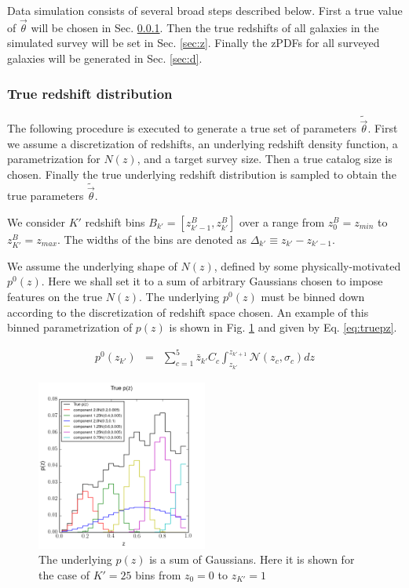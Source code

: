 \documentclass[preprint]{aastex}
\begin{document}
Data simulation consists of several broad steps described below.  First a true value of $\vec{\theta}$ will be chosen in Sec. \ref{sec:theta}.  Then the true redshifts of all galaxies in the simulated survey will be set in Sec. \ref{sec:z}.  Finally the zPDFs for all surveyed galaxies will be generated in Sec. \ref{sec:d}.

\clearpage
\subsubsection{True redshift distribution}
\label{sec:theta}

The following procedure is executed to generate a true set of parameters $\tilde{\vec{\theta}}$.  First we assume a discretization of redshifts, an underlying redshift density function, a parametrization for $N(z)$, and a target survey size.  Then a true catalog size is chosen.  Finally the true underlying redshift distribution is sampled to obtain the true parameters $\tilde{\vec{\theta}}$.

We consider $K'$ redshift bins $B_{k'}=[z^{B}_{k'-1},z^{B}_{k'}]$ over a range from $z^{B}_{0}=z_{min}$ to $z^{B}_{K'}=z_{max}$.  The widths of the bins are denoted as $\Delta_{k'}\equiv z_{k'}-z_{k'-1}$.

We assume the underlying shape of $N(z)$, defined by some physically-motivated $p^{0}(z)$.  Here we shall set it to a sum of arbitrary Gaussians chosen to impose features on the true $N(z)$.  The underlying $p^{0}(z)$ must be binned down according to the discretization of redshift space chosen.  An example of this binned parametrization of $p(z)$ is shown in Fig. \ref{fig:physPz} and given by Eq. \ref{eq:truepz}.

\begin{eqnarray}
\label{eq:truepz}
p^{0}(z_{k'}) &=& \sum_{c=1}^{5}\bar{z}_{k'}C_{c}\int_{z_{k'}}^{z_{k'+1}} \mathcal{N}(z_{c},\sigma_{c})dz
\end{eqnarray}

\begin{figure}
\label{fig:physPz}
\includegraphics[width=0.5\textwidth]{physPz.png}
\caption{The underlying $p(z)$ is a sum of Gaussians.  Here it is shown for the case of $K'=25$ bins from $z_{0}=0$ to $z_{K'}=1$}
\end{figure}
\end{document}
